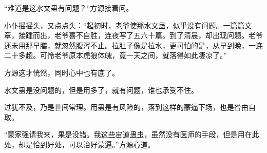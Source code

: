 \begin{this_body}
“难道是这水文蛊有问题？”方源接着问。

小仆摇摇头，又点点头：“起初时，老爷使那水文蛊，似乎没有问题。一篇篇文章，接踵而出，老爷喜不自胜，连夜写了五六十篇。到了清晨，却出现问题。老爷还未用那早膳，就忽然腹泻不止。拉肚子像是拉水，更可怕的是，从早到晚，一连二十多趟。可怜老爷原本虎狼体魄，竟一天之间，就落得如此凄凉了。”

方源这才恍然，同时心中也有底了。

水文蛊是没问题的，但是用多了，就有问题，谁也承受不住。

过犹不及，乃是世间常理。用蛊是有风险的，落到这样的蒙逼下场，也是咎由自取。

“蒙家强请我来，果是没错。我这些宙道蛊虫，虽然没有医师的手段，但是用在此处，却是恰到好处，可以治好蒙逼。”方源心道。

\end{this_body}


